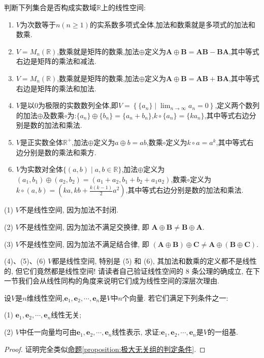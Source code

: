 \documentclass[../../main.tex]{subfiles}
\begin{document}
\begin{example}\label{example:3.3}
判断下列集合是否构成实数域\(\mathbb{R}\)上的线性空间:
\begin{enumerate}[(1)]
\item \(V\)为次数等于\(n(n\geq1)\)的实系数多项式全体,加法和数乘就是多项式的加法和数乘.
\item \(V = M_n(\mathbb{R})\),数乘就是矩阵的数乘,加法\(\oplus\)定义为\(\boldsymbol{A}\oplus\boldsymbol{B}=\boldsymbol{A}\boldsymbol{B}-\boldsymbol{B}\boldsymbol{A}\),其中等式右边是矩阵的乘法和减法.
\item \(V = M_n(\mathbb{R})\),数乘就是矩阵的数乘,加法\(\oplus\)定义为\(\boldsymbol{A}\oplus\boldsymbol{B}=\boldsymbol{A}\boldsymbol{B}+\boldsymbol{B}\boldsymbol{A}\),其中等式右边是矩阵的乘法和加法.
\item \label{example:3.3(4)}\(V\)是以\(0\)为极限的实数数列全体,即\(V = \left\{\{a_n\}\mid\lim_{n\rightarrow\infty}a_n = 0\right\}\),定义两个数列的加法\(\oplus\)及数乘\(\circ\)为:\(\{a_n\}\oplus\{b_n\}=\{a_n + b_n\}\),\(k\circ\{a_n\}=\{ka_n\}\),其中等式右边分别是数的加法和乘法.
\item \label{example:3.3(5)}\(V\)是正实数全体\(\mathbb{R}^+\),加法\(\oplus\)定义为\(a\oplus b = ab\),数乘\(\circ\)定义为\(k\circ a = a^k\),其中等式右边分别是数的乘法和乘方.
\item \label{example:3.3(6)}\(V\)为实数对全体\(\{(a,b)\mid a,b\in\mathbb{R}\}\),加法\(\oplus\)定义为\((a_1,b_1)\oplus(a_2,b_2)=(a_1 + a_2,b_1 + b_2 + a_1a_2)\),数乘\(\circ\)定义为\(k\circ(a,b)=(ka,kb+\frac{k(k - 1)}{2}a^2)\),其中等式右边分别是数的加法和乘法.
\end{enumerate}
\end{example}
\begin{solution}
(1) \(V\)不是线性空间, 因为加法不封闭.

(2) \(V\)不是线性空间, 因为加法不满足交换律, 即 \(\boldsymbol{A}\oplus\boldsymbol{B}\neq\boldsymbol{B}\oplus\boldsymbol{A}\).

(3) \(V\)不是线性空间, 因为加法不满足结合律, 即 \((\boldsymbol{A}\oplus\boldsymbol{B})\oplus\boldsymbol{C}\neq\boldsymbol{A}\oplus(\boldsymbol{B}\oplus\boldsymbol{C})\).

(4)、(5)、(6) \(V\)都是线性空间, 特别是 (5) 和 (6), 其加法和数乘的定义都不是线性的, 但它们竟然都是线性空间! 请读者自己验证线性空间的 8 条公理的确成立, 在下一节我们会从线性同构的角度来说明它们成为线性空间的深层次理由.
\end{solution}

\begin{proposition}
设\(V\)是\(n\)维线性空间,\(\boldsymbol{e}_1,\boldsymbol{e}_2,\cdots,\boldsymbol{e}_n\)是\(V\)中\(n\)个向量. 若它们满足下列条件之一:

(1) \(\boldsymbol{e}_1,\boldsymbol{e}_2,\cdots,\boldsymbol{e}_n\)线性无关;

(2) \(V\)中任一向量均可由\(\boldsymbol{e}_1,\boldsymbol{e}_2,\cdots,\boldsymbol{e}_n\)线性表示,
求证:\(\boldsymbol{e}_1,\boldsymbol{e}_2,\cdots,\boldsymbol{e}_n\)是\(V\)的一组基.
\end{proposition}
\begin{proof}
证明完全类似\hyperref[proposition:极大无关组的判定条件]{命题\ref{proposition:极大无关组的判定条件}}.
\end{proof}
\end{document}
